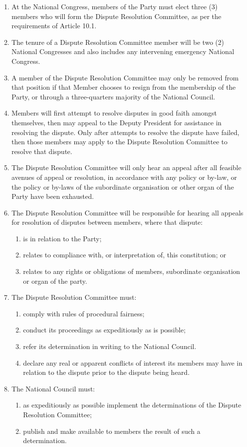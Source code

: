 \documentclass[a4paper,titlepage,8.5pt]{article}
\begin{document}
\begin{enumerate}
\item At the National Congress, members of the Party must elect three (3) members who will form the Dispute Resolution Committee, as per the requirements of Article 10.1.
\item The tenure of a Dispute Resolution Committee member will be two (2) National Congresses and also includes any intervening emergency National Congress.
\item A member of the Dispute Resolution Committee may only be removed from that position if that Member chooses to resign from the membership of the Party, or through a three-quarters majority of the National Council.
\item Members will first attempt to resolve disputes in good faith amongst themselves, then may appeal to the Deputy President for assistance in resolving the dispute. Only after attempts to resolve the dispute have failed, then those members may apply to the Dispute Resolution Committee to resolve that dispute.
\item The Dispute Resolution Committee will only hear an appeal after all feasible avenues of appeal or resolution, in accordance with any policy or by-law, or the policy or by-laws of the subordinate organisation or other organ of the Party have been exhausted.
\item The Dispute Resolution Committee will be responsible for hearing all appeals for resolution of disputes between members, where that dispute:
\begin{enumerate}
\item is in relation to the Party;
\item relates to compliance with, or interpretation of, this constitution; or
\item relates to any rights or obligations of members, subordinate organisation or organ of the party.
\end{enumerate}
\item The Dispute Resolution Committee must:
\begin{enumerate}
\item comply with rules of procedural fairness;
\item conduct its proceedings as expeditiously as is possible;
\item refer its determination in writing to the National Council.
\item declare any real or apparent conflicts of interest its members may have in relation to the dispute prior to the dispute being heard.
\end{enumerate}
\item The National Council must:
\begin{enumerate}
\item as expeditiously as possible implement the determinations of the Dispute Resolution Committee;
\item publish and make available to members the result of such a determination.
\end{enumerate}
\end{enumerate}
\end{document}
